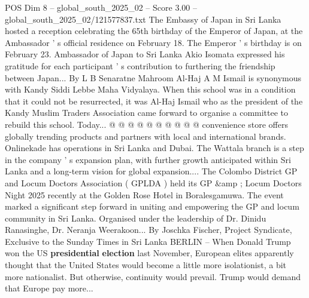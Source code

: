 \begin{textsample}{POS Dim 8 – global\_south\_2025\_02 – Score 3.00 – global\_south\_2025\_02/121577837.txt}
The Embassy of Japan in Sri Lanka hosted a reception celebrating the 65th birthday of the Emperor of Japan, at the Ambassador ' s official residence on February 18.
The Emperor ' s birthday is on February 23.
Ambassador of Japan to Sri Lanka Akio Isomata expressed his gratitude for each participant ' s contribution to furthering the friendship between Japan...
By L B Senaratne Mahroom Al-Haj A M Ismail is synonymous with Kandy Siddi Lebbe Maha Vidyalaya.
When this school was in a condition that it could not be resurrected, it was Al-Haj Ismail who as the president of the Kandy Muslim Traders Association came forward to organise a committee to rebuild this school.
Today... @ @ @ @ @ @ @ @ @ @ convenience store offers globally trending products and partners with local and international brands.
Onlinekade has operations in Sri Lanka and Dubai.
The Wattala branch is a step in the company ' s expansion plan, with further growth anticipated within Sri Lanka and a long-term vision for global expansion....
The Colombo District GP and Locum Doctors Association ( GPLDA ) held its GP \&amp ; Locum Doctors Night 2025 recently at the Golden Rose Hotel in Boralesgamuwa.
The event marked a significant step forward in uniting and empowering the GP and locum community in Sri Lanka.
Organised under the leadership of Dr.
Dinidu Ranasinghe, Dr.
Neranja Weerakoon...
By Joschka Fischer, Project Syndicate, Exclusive to the Sunday Times in Sri Lanka BERLIN -- When Donald Trump won the US \textbf{presidential} \textbf{election} last November, European elites apparently thought that the United States would become a little more isolationist, a bit more nationalist.
But otherwise, continuity would prevail.
Trump would demand that Europe pay more...

\end{textsample}

